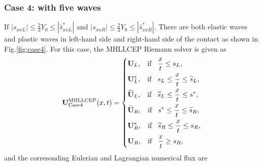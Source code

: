 \documentclass[review]{elsarticle}
\begin{document}
\subsubsection{Case 4: with five waves}
If $|s_{xxL}| \le \frac{2}{3}Y_0 \le  |\hat{s}_{xxL}^*|$ and  $|s_{xxR}| \le \frac{2}{3}Y_0 \le  |\hat{s}_{xxR}^*|$. There are  both elastic waves and plastic waves in left-hand side and right-hand side of the contact as shown in Fig.\ref{fig:case4}. For this case, the MHLLCEP Riemann solver is given as
 \begin{equation}
   \mathbf{U}^{\text{MHLLCEP}}_{\text{Case4}}(x,t) = \left\{ \begin{aligned}
        & \mathbf{U}_L, \hspace{0.3cm} \text{if} \hspace{0.3cm} \frac{x}{t}\le s_L, \\
        & \mathbf{U}_L^*, \hspace{0.3cm} \text{if} \hspace{0.3cm} s_L\le \frac{x}{t} \le \widetilde{s}_L, \\
        & \widetilde{\mathbf{U}}_L, \hspace{0.3cm} \text{if} \hspace{0.3cm} \widetilde{s}_L\le \frac{x}{t} \le s^*, \\
        & \widetilde{\mathbf{U}}_R, \hspace{0.3cm} \text{if} \hspace{0.3cm} s^*\le \frac{x}{t} \le \widetilde{s}_R, \\
        & \mathbf{U}_R^*, \hspace{0.3cm} \text{if} \hspace{0.3cm} \widetilde{s}_R\le \frac{x}{t} \le s_R,\\
        & \mathbf{U}_R, \hspace{0.3cm} \text{if} \hspace{0.3cm} \frac{x}{t}\ge s_R, \\
      \end{aligned}
    \right.
  \end{equation}
  and the corresonding Eulerian and Lagrangian numerical flux are
\end{document}
